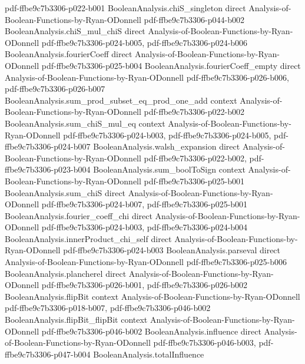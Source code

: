 \begin{theorem}
  {pdf-ffbe9c7b3306-p022-b001}
\proofstep
  {BooleanAnalysis.chiS_singleton}
  {direct}
  {Analysis-of-Boolean-Functions-by-Ryan-ODonnell}
  {pdf-ffbe9c7b3306-p044-b002}
\proofstep
  {BooleanAnalysis.chiS_mul_chiS}
  {direct}
  {Analysis-of-Boolean-Functions-by-Ryan-ODonnell}
  {pdf-ffbe9c7b3306-p024-b005,
    pdf-ffbe9c7b3306-p024-b006}
\proofstep
  {BooleanAnalysis.fourierCoeff}
  {direct}
  {Analysis-of-Boolean-Functions-by-Ryan-ODonnell}
  {pdf-ffbe9c7b3306-p025-b004}
\proofstep
  {BooleanAnalysis.fourierCoeff_empty}
  {direct}
  {Analysis-of-Boolean-Functions-by-Ryan-ODonnell}
  {pdf-ffbe9c7b3306-p026-b006,
    pdf-ffbe9c7b3306-p026-b007}
\proofstep
  {BooleanAnalysis.sum_prod_subset_eq_prod_one_add}
  {context}
  {Analysis-of-Boolean-Functions-by-Ryan-ODonnell}
  {pdf-ffbe9c7b3306-p022-b002}
\proofstep
  {BooleanAnalysis.sum_chiS_mul_eq}
  {context}
  {Analysis-of-Boolean-Functions-by-Ryan-ODonnell}
  {pdf-ffbe9c7b3306-p024-b003,
    pdf-ffbe9c7b3306-p024-b005,
    pdf-ffbe9c7b3306-p024-b007}
\proofstep
  {BooleanAnalysis.walsh_expansion}
  {direct}
  {Analysis-of-Boolean-Functions-by-Ryan-ODonnell}
  {pdf-ffbe9c7b3306-p022-b002,
    pdf-ffbe9c7b3306-p023-b004}
\proofstep
  {BooleanAnalysis.sum_boolToSign}
  {context}
  {Analysis-of-Boolean-Functions-by-Ryan-ODonnell}
  {pdf-ffbe9c7b3306-p025-b001}
\proofstep
  {BooleanAnalysis.sum_chiS}
  {direct}
  {Analysis-of-Boolean-Functions-by-Ryan-ODonnell}
  {pdf-ffbe9c7b3306-p024-b007,
    pdf-ffbe9c7b3306-p025-b001}
\proofstep
  {BooleanAnalysis.fourier_coeff_chi}
  {direct}
  {Analysis-of-Boolean-Functions-by-Ryan-ODonnell}
  {pdf-ffbe9c7b3306-p024-b003,
    pdf-ffbe9c7b3306-p024-b004}
\proofstep
  {BooleanAnalysis.innerProduct_chi_self}
  {direct}
  {Analysis-of-Boolean-Functions-by-Ryan-ODonnell}
  {pdf-ffbe9c7b3306-p024-b003}
\proofstep
  {BooleanAnalysis.parseval}
  {direct}
  {Analysis-of-Boolean-Functions-by-Ryan-ODonnell}
  {pdf-ffbe9c7b3306-p025-b006}
\proofstep
  {BooleanAnalysis.plancherel}
  {direct}
  {Analysis-of-Boolean-Functions-by-Ryan-ODonnell}
  {pdf-ffbe9c7b3306-p026-b001,
    pdf-ffbe9c7b3306-p026-b002}
\proofstep
  {BooleanAnalysis.flipBit}
  {context}
  {Analysis-of-Boolean-Functions-by-Ryan-ODonnell}
  {pdf-ffbe9c7b3306-p018-b007,
    pdf-ffbe9c7b3306-p046-b002}
\proofstep
  {BooleanAnalysis.flipBit_flipBit}
  {context}
  {Analysis-of-Boolean-Functions-by-Ryan-ODonnell}
  {pdf-ffbe9c7b3306-p046-b002}
\proofstep
  {BooleanAnalysis.influence}
  {direct}
  {Analysis-of-Boolean-Functions-by-Ryan-ODonnell}
  {pdf-ffbe9c7b3306-p046-b003,
    pdf-ffbe9c7b3306-p047-b004}
\proofstep
  {BooleanAnalysis.totalInfluence}

\end{theorem}
